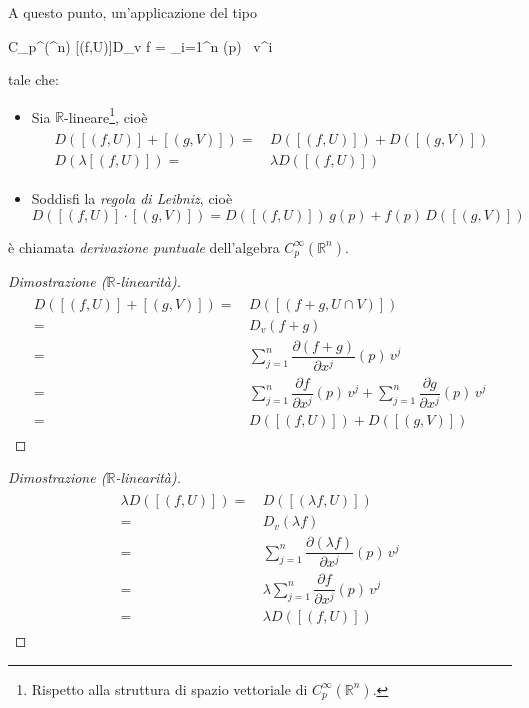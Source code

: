 A questo punto, un'applicazione del tipo

%
	{C_{p}^{\infty}(\R^{n})}{\R}%
	{[(f,U)]}{D_{v} f = \sum_{i=1}^{n}  (p) \, v^{i}}

tale che:

\begin{itemize}
	\item Sia $ \mathbb{R} $-lineare\footnote{%
		Rispetto alla struttura di spazio vettoriale di $ C_{p}^{\infty}(\mathbb{R}^{n}) $.%
	}, cioè
		\begin{align}
			\begin{split}
				D ([(f,U)] + [(g,V)]) =& \, D ([(f,U)]) + D ([(g,V)])\\
				D (\lambda [(f,U)]) =& \, \lambda D ([(f,U)])
			\end{split}
		\end{align}
	
	\item Soddisfi la \textit{regola di Leibniz}, cioè
		\begin{equation}
			D ([(f,U)] \cdot [(g,V)]) = D ([(f,U)]) \, g(p) + f(p) \, D ([(g,V)])
		\end{equation}
\end{itemize}

è chiamata \textit{derivazione puntuale} dell'algebra $ C_{p}^{\infty}(\mathbb{R}^{n}) $.

\begin{proof}[Dimostrazione ($ \mathbb{R} $-linearità)]
	\begin{align}
		\begin{split}
			D ([(f,U)] + [(g,V)]) =& \, D ([(f+g,U \cap V)])\\
			=& \, D_{v} (f+g)\\
			=& \, \sum_{j=1}^{n} \dfrac{\partial (f+g)}{\partial x^{j}} (p) \, v^{j}\\
			=& \, \sum_{j=1}^{n} \dfrac{\partial f}{\partial x^{j}} (p) \, v^{j} + \sum_{j=1}^{n} \dfrac{\partial g}{\partial x^{j}} (p) \, v^{j}\\
			=& \, D ([(f,U)]) + D ([(g,V)])
		\end{split}
	\end{align}
\end{proof}

\begin{proof}[Dimostrazione ($ \mathbb{R} $-linearità)]
	\begin{align}
		\begin{split}
			\lambda D ([(f,U)]) =& \, D ([(\lambda f,U)])\\
			=& \, D_{v} (\lambda f)\\
			=& \, \sum_{j=1}^{n} \dfrac{\partial (\lambda f)}{\partial x^{j}} (p) \, v^{j}\\
			=& \, \lambda \sum_{j=1}^{n} \dfrac{\partial f}{\partial x^{j}} (p) \, v^{j}\\
			=& \, \lambda D ([(f,U)])
		\end{split}
	\end{align}
\end{proof}

